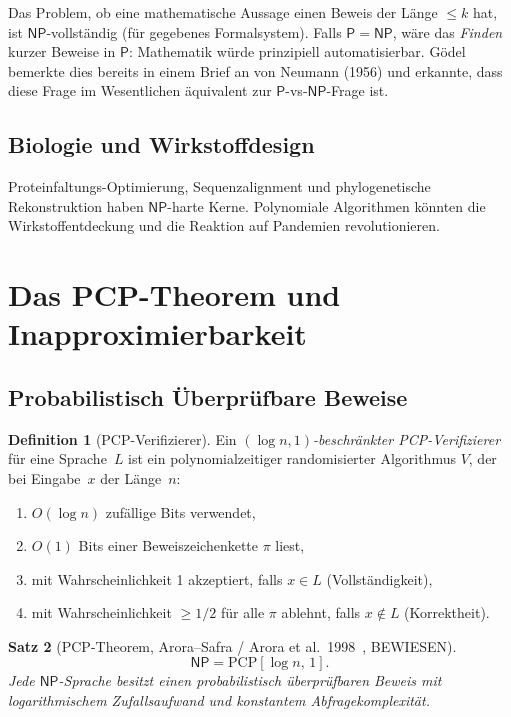 \documentclass[12pt,a4paper]{amsart}
\newtheorem{theorem}{Satz}[section]
\theoremstyle{definition}
\newtheorem{definition}[theorem]{Definition}
\newcommand{\Pclass}{\mathsf{P}}
\newcommand{\NP}{\mathsf{NP}}
\begin{document}
Das Problem, ob eine mathematische Aussage einen Beweis der Länge $\leq k$ hat,
ist $\NP$-vollständig (für gegebenes Formalsystem).  Falls $\Pclass=\NP$, wäre
das \emph{Finden} kurzer Beweise in $\Pclass$: Mathematik würde prinzipiell
automatisierbar.  Gödel bemerkte dies bereits in einem Brief an von Neumann
(1956) und erkannte, dass diese Frage im Wesentlichen äquivalent zur
$\Pclass$-vs-$\NP$-Frage ist.

\subsection{Biologie und Wirkstoffdesign}

Proteinfaltungs-Optimierung, Sequenzalignment und phylogenetische Rekonstruktion
haben $\NP$-harte Kerne.  Polynomiale Algorithmen könnten die
Wirkstoffentdeckung und die Reaktion auf Pandemien revolutionieren.

\section{Das PCP-Theorem und Inapproximierbarkeit}
\label{sec:pcp}

\subsection{Probabilistisch Überprüfbare Beweise}

\begin{definition}[PCP-Verifizierer]
Ein \emph{$(\log n, 1)$-beschränkter PCP-Verifizierer} für eine Sprache~$L$
ist ein polynomialzeitiger randomisierter Algorithmus $V$, der bei Eingabe~$x$
der Länge~$n$:
\begin{enumerate}[label=(\roman*)]
  \item $O(\log n)$ zufällige Bits verwendet,
  \item $O(1)$ Bits einer Beweiszeichenkette $\pi$ liest,
  \item mit Wahrscheinlichkeit 1 akzeptiert, falls $x\in L$ (Vollständigkeit),
  \item mit Wahrscheinlichkeit $\geq 1/2$ für alle $\pi$ ablehnt, falls
    $x\notin L$ (Korrektheit).
\end{enumerate}
\end{definition}

\begin{theorem}[PCP-Theorem, Arora--Safra / Arora et al.\ 1998~\cite{arora1998}, BEWIESEN]
\[
  \NP = \mathrm{PCP}[\log n,\, 1].
\]
Jede $\NP$-Sprache besitzt einen probabilistisch überprüfbaren Beweis mit
logarithmischem Zufallsaufwand und konstantem Abfragekomplexität.
\end{theorem}
\end{document}
